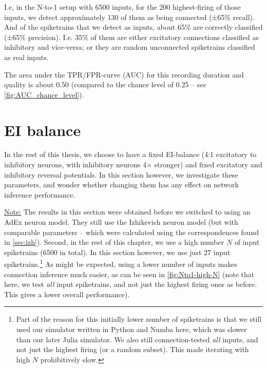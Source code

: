 I.e, in the N-to-1 setup with 6500 inputs, for the 200 highest-firing of those inputs, we detect approximately 130 of them as being connected (±65\% recall). And of the spiketrains that we detect as inputs, about 65\% are correctly classified  (±65\% precision). I.e. 35\% of them are either excitatory connections classified as inhibitory and vice-versa; or they are random unconnected spiketrains classified as real inputs.

The area under the TPR/FPR-curve (AUC) for this recording duration and quality is about 0.50 (compared to the chance level of 0.25 -- see \cref{fig:AUC_chance_level}).



\section{EI balance}

In the rest of this thesis, we choose to have a fixed EI-balance (4:1 excitatory to inhibitory neurons, with  inhibitory neurons 4× stronger) and fixed excitatory and inhibitory reversal potentials. In this section however, we investigate these parameters, and wonder whether changing them has any effect on network inference performance.


\underline{Note:} The results in this section were obtained before we switched to using an AdEx neuron model. They still use the Izhikevich neuron model (but with comparable parameters -- which were calculated using the correspondences found in \cref{sec:izh}). Second, in the rest of this chapter, we use a high number $N$ of input spiketrains (6500 in total). In this section however, we use just 27 input spiketrains.\footnote{
    Part of the reason for this initially lower number of spiketrains is that we still used our simulator written in Python and Numba here, which was slower than our later Julia simulator. We also still connection-tested \emph{all} inputs, and not just the highest firing (or a random subset). This made iterating with high $N$ prohibitively slow.
}
As might be expected, using a lower number of inputs makes connection inference much easier, as can be seen in \cref{fig:Nto1-high-N} (note that here, we test \emph{all} input spiketrains, and not just the highest firing ones as before. This gives a lower overall performance).

